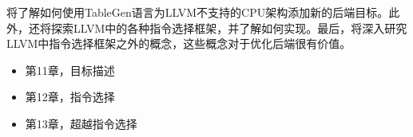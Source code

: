 将了解如何使用TableGen语言为LLVM不支持的CPU架构添加新的后端目标。此外，还将探索LLVM中的各种指令选择框架，并了解如何实现。最后，将深入研究LLVM中指令选择框架之外的概念，这些概念对于优化后端很有价值。

\begin{itemize}
\item
第11章，目标描述

\item
第12章，指令选择

\item
第13章，超越指令选择
\end{itemize}